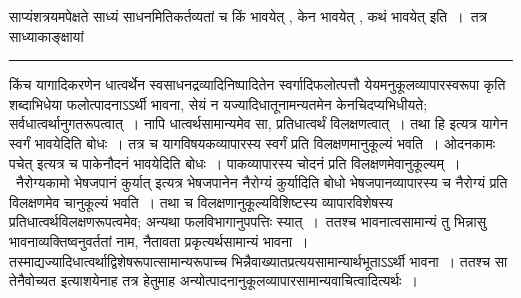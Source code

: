 \documentclass[11pt, openany]{book}
\begin{document}
{\bl साप्यंशत्रयमपेक्षते साध्यं साधनमितिकर्तव्यतां च {\qtl किं भावयेत् , केन भावयेत् , कथं भावयेत्} इति~।~तत्र साध्याकाङ्क्षायां}\\
\hrule
\vspace{3mm}

किंच यागादिकरणेन धात्वर्थेन स्वसाधनद्रव्यादिनिष्पादितेन स्वर्गादिफलोत्पत्तौ येयमनुकूलव्यापारस्वरूपा {\qt कृति} शब्दाभिधेया फलोत्पादनाऽऽर्थी भावना, सेयं न यज्यादिधातूनामन्यतमेन केनचिदप्यभिधीयते; सर्वधात्वर्थानुगतरूपत्वात्~। नापि धात्वर्थसामान्यमेव सा, प्रतिधात्वर्थं विलक्षणत्वात्~। तथा हि इत्यत्र यागेन स्वर्गं भावयेदिति बोधः~। तत्र च यागविषयकव्यापारस्य स्वर्गं  प्रति विलक्षणमानुकूल्यं भवति~। {\qt ओदनकामः पचेत्} इत्यत्र च पाकेनौदनं भावयेदिति बोधः~। पाकव्यापारस्य चोदनं प्रति विलक्षणमेवानुकूल्यम्~।~{\qt नैरोग्यकामो भेषजपानं कुर्यात्} इत्यत्र भेषजपानेन नैरोग्यं कुर्यादिति बोधो भेषजपानव्यापारस्य च नैरोग्यं प्रति विलक्षणमेव चानुकूल्यं भवति~। तथा च विलक्षणानुकूल्यविशिष्टस्य व्यापारविशेषस्य प्रतिधात्वर्थविलक्षणरूपत्वमेव; अन्यथा फलविभागानुपपत्तिः स्यात्~।~ततश्च भावनात्वसामान्यं तु भिन्नासु भावनाव्यक्तिष्वनुवर्ततां नाम, नैतावता प्रकृत्यर्थसामान्यं भावना~। तस्माद्यज्यादिधात्वर्थाद्विशेषरूपात्सामान्यरूपाच्च भिन्नैवाख्यातप्रत्ययसामान्यार्थभूताऽऽर्थी भावना~। ततश्च सा तेनैवोच्यत इत्याशयेनाह तत्र हेतुमाह अन्योत्पादनानुकूलव्यापारसामान्यवाचित्वादित्यर्थः~।\\
\end{document}

